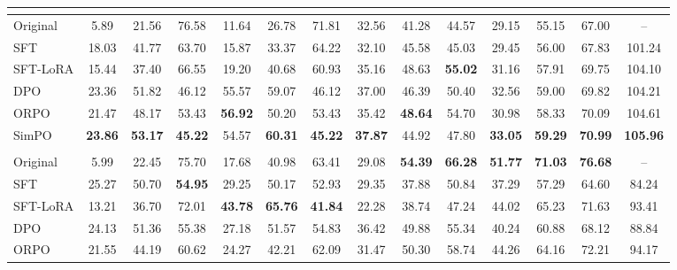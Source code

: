 \begin{table*}[!t]
\begin{minipage}[t]{\linewidth}
\begin{tabular}{l|ccc|ccc|ccc|cccc}
        \hline
        \multicolumn{13}{c}{\text{\textit{Qwen2.5-Coder-7B-Instruct}}}\\
        \hline
        Original & 5.89 & 21.56 & 76.58 & 11.64 & 26.78 & 71.81 & 32.56 & 41.28 & 44.57 & 29.15 & 55.15 & 67.00 & --\\
        SFT & 18.03 & 41.77 & 63.70 & 15.87 & 33.37 & 64.22 & 32.10 & 45.58 & 45.03 & 29.45 & 56.00 & 67.83 & 101.24\\
        SFT-LoRA & 15.44 & 37.40 & 66.55 & 19.20 & 40.68 & 60.93 & 35.16 & 48.63 & \cellcolor{lightblue}\textbf{55.02} & 31.16 & 57.91 & 69.75 & 104.10\\
        DPO & 23.36 & 51.82 & 46.12 & 55.57 & 59.07 & 46.12 & 37.00 & 46.39 & 50.40 & 32.56 & 59.00 & 69.82 & 104.21\\
        ORPO & 21.47 & 48.17 & 53.43 & \cellcolor{lightblue}\textbf{56.92} & 50.20 & 53.43 & 35.42 & \cellcolor{lightblue}\textbf{48.64} & 54.70 & 30.98 & 58.33 & 70.09 & 104.61\\
        SimPO & \cellcolor{lightblue}\textbf{23.86} & \cellcolor{lightblue}\textbf{53.17} & \cellcolor{lightblue}\textbf{45.22} & 54.57 & \cellcolor{lightblue}\textbf{60.31} & \cellcolor{lightblue}\textbf{45.22} & \cellcolor{lightblue}\textbf{37.87} & 44.92 & 47.80 & \cellcolor{lightblue}\textbf{33.05} & \cellcolor{lightblue}\textbf{59.29} & \cellcolor{lightblue}\textbf{70.99} & \cellcolor{lightblue}\textbf{105.96}\\
        \hline
        \multicolumn{13}{c}{\text{\textit{Llama-3.1-8B-Instruct}}}\\
        \hline
        Original & 5.99 & 22.45 & 75.70 & 17.68 & 40.98 & 63.41 & 29.08 & \cellcolor{lightblue}\textbf{54.39} & \cellcolor{lightblue}\textbf{66.28} & \cellcolor{lightblue}\textbf{51.77} & \cellcolor{lightblue}\textbf{71.03} & \cellcolor{lightblue}\textbf{76.68} & --\\
        SFT & 25.27 & 50.70 & \cellcolor{lightblue}\textbf{54.95} & 29.25 & 50.17 & 52.93 & 29.35 & 37.88 & 50.84 & 37.29 & 57.29 & 64.60 & 84.24\\
        SFT-LoRA & 13.21 & 36.70 & 72.01 & \cellcolor{lightblue}\textbf{43.78} & \cellcolor{lightblue}\textbf{65.76} & \cellcolor{lightblue}\textbf{41.84} & 22.28 & 38.74& 47.24 & 44.02 & 65.23 & 71.63 & 93.41\\
        DPO & 24.13 & 51.36 & 55.38 & 27.18 & 51.57 & 54.83 & 36.42 & 49.88 & 55.34 & 40.24 & 60.88 & 68.12 & 88.84\\
        ORPO & 21.55 & 44.19 & 60.62 & 24.27 & 42.21 & 62.09 & 31.47 & 50.30 & 58.74 & 44.26 & 64.16 & 72.21 & 94.17\\

\end{tabular}
\end{minipage}
\end{table*}
